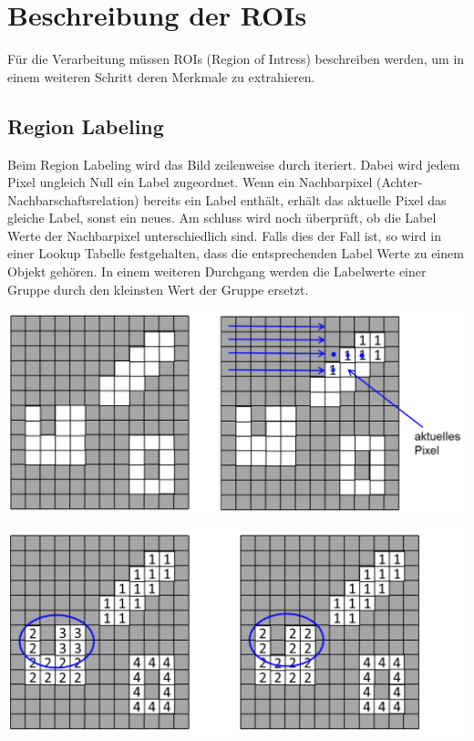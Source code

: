 \section{Beschreibung der ROIs}
Für die Verarbeitung müssen ROIs (Region of Intress) beschreiben werden, um in einem weiteren Schritt deren Merkmale zu extrahieren.

\subsection{Region Labeling}
Beim Region Labeling wird das Bild zeilenweise durch iteriert.
Dabei wird jedem Pixel ungleich Null ein Label zugeordnet.
Wenn ein Nachbarpixel (Achter-Nachbarschaftsrelation) bereits ein Label enthält, erhält das aktuelle Pixel das gleiche Label, sonst ein neues.
Am schluss wird noch überprüft, ob die Label Werte der Nachbarpixel unterschiedlich sind.
Falls dies der Fall ist, so wird in einer Lookup Tabelle festgehalten, 
dass die entsprechenden Label Werte zu einem Objekt gehören.
In einem weiteren Durchgang werden die Labelwerte einer Gruppe durch den kleinsten Wert der Gruppe ersetzt.
\begin{center}
	\includegraphics[scale=.5]{../fig/labeling.png}
\end{center}
\begin{center}
	\includegraphics[scale=.5]{../fig/labeling2.png}
\end{center}

